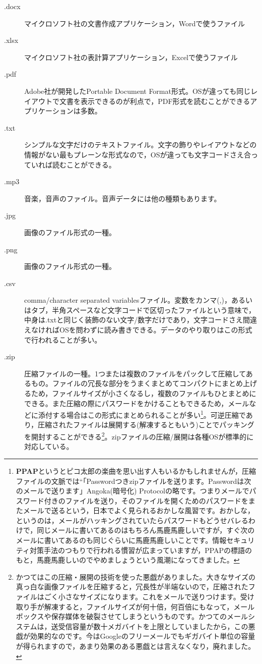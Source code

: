 \documentclass{ltjsbook}
\begin{document}
\begin{description}
	\item[.docx] マイクロソフト社の文書作成アプリケーション，Wordで使うファイル
	\item[.xlsx] マイクロソフト社の表計算アプリケーション，Excelで使うファイル
	\item[.pdf]  Adobe社が開発したPortable Document Format形式。OSが違っても同じレイアウトで文書を表示できるのが利点で，PDF形式を読むことができるアプリケーションは多数。
	\item[.txt] シンプルな文字だけのテキストファイル。文字の飾りやレイアウトなどの情報がない最もプレーンな形式なので，OSが違っても文字コードさえ合っていれば読むことができる。
	\item[.mp3] 音楽，音声のファイル。音声データには他の種類もあります。
	\item[.jpg] 画像のファイル形式の一種。
	\item[.png] 画像のファイル形式の一種。
	\item[.csv]  comma/character separated variablesファイル。変数をカンマ(,)，あるいはタブ，半角スペースなど文字コードで区切ったファイルという意味で，中身は.txtと同じく装飾のない文字/数字だけであり，文字コードさえ間違えなければOSを問わずに読み書きできる。データのやり取りはこの形式で行われることが多い。
	\item[.zip] 圧縮ファイルの一種。1つまたは複数のファイルをパックして圧縮してあるもの。ファイルの冗長な部分をうまくまとめてコンパクトにまとめ上げるため，ファイルサイズが小さくなるし，複数のファイルもひとまとめにできる。また圧縮の際にパスワードをかけることもできるため，メールなどに添付する場合はこの形式にまとめられることが多い\footnote{\textbf{PPAP}というとピコ太郎の楽曲を思い出す人もいるかもしれませんが，圧縮ファイルの文脈では``「Passwordつきzipファイルを送ります。Passwordは次のメールで送ります」Angoka(暗号化) Protocolの略です。つまりメールでパスワード付きのファイルを送り，そのファイルを開くためのパスワードをまたメールで送るという，日本でよく見られるおかしな風習です。おかしな，というのは，メールがハッキングされていたらパスワードもどうせバレるわけで，同じメールに書いてあるのはもちろん馬鹿馬鹿しいですが，すぐ次のメールに書いてあるのも同じぐらいに馬鹿馬鹿しいことです。情報セキュリティ対策手法のつもりで行われる慣習が広まっていますが，PPAPの標語のもと，馬鹿馬鹿しいのでやめましょうという風潮になってきました。}。可逆圧縮であり，圧縮されたファイルは展開する(解凍するともいう)ことでパッキングを開封することができる\footnote{かつてはこの圧縮・展開の技術を使った悪戯がありました。大きなサイズの真っ白な画像ファイルを圧縮すると，冗長性が半端ないので，圧縮されたファイルはごく小さなサイズになります。これをメールで送りつけます。受け取り手が解凍すると，ファイルサイズが何十倍，何百倍にもなって，メールボックスや保存媒体を破裂させてしまうというものです。かつてのメールシステムは，送受信容量が数十メガバイトを上限としていましたから，この悪戯が効果的なのです。今はGoogleのフリーメールでもギガバイト単位の容量が得られますので，あまり効果のある悪戯とは言えなくなり，廃れました。}。zipファイルの圧縮/展開は各種OSが標準的に対応している。
\end{description}
\end{document}
